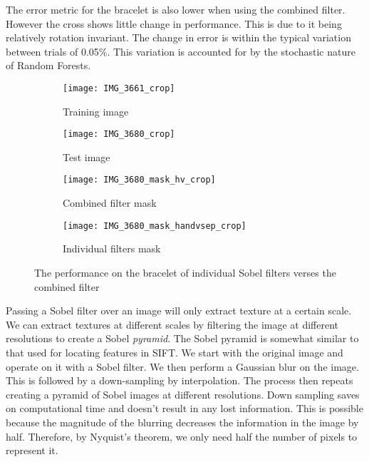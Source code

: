 \documentclass[12pt]{IIBproject}
\begin{document}
 The error metric for the bracelet is also lower when using the combined filter. However the cross shows little change in performance. This is due to it being relatively rotation invariant. The change in error is within the typical variation between trials of 0.05\%. This variation is accounted for by the stochastic nature of Random Forests.
\begin{figure}[H]
\centering
\begin{subfigure}{.45\textwidth}
  \centering
  \texttt{[image: IMG\_3661\_crop]}
  \caption{Training image}
  \label{fig:sub2}
\end{subfigure}
\begin{subfigure}{.45\textwidth}
  \centering
  \texttt{[image: IMG\_3680\_crop]}
  \caption{Test image}
  \label{fig:sub2}
\end{subfigure}
\begin{subfigure}{.45\textwidth}
  \centering
  \texttt{[image: IMG\_3680\_mask\_hv\_crop]}
  \caption{Combined filter mask}
  \label{fig:sub1}
\end{subfigure}%
\begin{subfigure}{.45\textwidth}
  \centering
  \texttt{[image: IMG\_3680\_mask\_handvsep\_crop]}
  \caption{Individual filters mask}
  \label{fig:sub2}
\end{subfigure}

\caption{The performance on the bracelet of individual Sobel filters verses the combined filter}
\label{fig:test}
\end{figure}

Passing a Sobel filter over an image will only extract texture at a certain scale. We can extract textures at different scales by filtering the image at different resolutions to create a Sobel \emph{pyramid}. The Sobel pyramid is somewhat similar to that used for locating features in SIFT\cite{lowe1999object}. We start with the original image and operate on it with a Sobel filter. We then perform a Gaussian blur on the image. This is followed by a down-sampling by interpolation. The process then repeats creating a pyramid of Sobel images at different resolutions. Down sampling saves on computational time and doesn't result in any lost information. This is possible because the magnitude of the blurring decreases the information in the image by half. Therefore, by Nyquist's theorem, we only need half the number of pixels to represent it.
\end{document}
